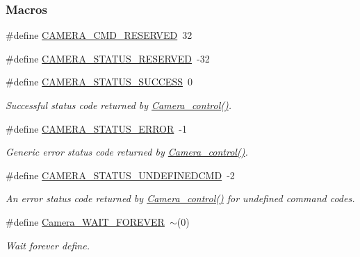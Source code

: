 \subsubsection*{Macros}
\begin{DoxyCompactItemize}
\item 
\#define \hyperlink{group___c_a_m_e_r_a___c_o_n_t_r_o_l_gaed2b3df48a75ec7e6e78320bb3a48eb9}{C\+A\+M\+E\+R\+A\+\_\+\+C\+M\+D\+\_\+\+R\+E\+S\+E\+R\+V\+E\+D}~32
\item 
\#define \hyperlink{group___c_a_m_e_r_a___c_o_n_t_r_o_l_ga13b3728d2673d72db6cc71744a0cbedf}{C\+A\+M\+E\+R\+A\+\_\+\+S\+T\+A\+T\+U\+S\+\_\+\+R\+E\+S\+E\+R\+V\+E\+D}~-\/32
\item 
\#define \hyperlink{group___camera___s_t_a_t_u_s_gaa4d73b4da4ce113c8fb545d1f2649257}{C\+A\+M\+E\+R\+A\+\_\+\+S\+T\+A\+T\+U\+S\+\_\+\+S\+U\+C\+C\+E\+S\+S}~0
\begin{DoxyCompactList}\small\item\em Successful status code returned by \hyperlink{_camera_8h_adfc7e9a60daa499220296a238a09b393}{Camera\+\_\+control()}. \end{DoxyCompactList}\item 
\#define \hyperlink{group___camera___s_t_a_t_u_s_ga2863402eca66d26cf447fc02340a0d45}{C\+A\+M\+E\+R\+A\+\_\+\+S\+T\+A\+T\+U\+S\+\_\+\+E\+R\+R\+O\+R}~-\/1
\begin{DoxyCompactList}\small\item\em Generic error status code returned by \hyperlink{_camera_8h_adfc7e9a60daa499220296a238a09b393}{Camera\+\_\+control()}. \end{DoxyCompactList}\item 
\#define \hyperlink{group___camera___s_t_a_t_u_s_gaae8cae4253d68cc8ae921b63a74d1cb9}{C\+A\+M\+E\+R\+A\+\_\+\+S\+T\+A\+T\+U\+S\+\_\+\+U\+N\+D\+E\+F\+I\+N\+E\+D\+C\+M\+D}~-\/2
\begin{DoxyCompactList}\small\item\em An error status code returned by \hyperlink{_camera_8h_adfc7e9a60daa499220296a238a09b393}{Camera\+\_\+control()} for undefined command codes. \end{DoxyCompactList}\item 
\#define \hyperlink{_camera_8h_a1b85e579e68cecb09d1e2be70a6c56a9}{Camera\+\_\+\+W\+A\+I\+T\+\_\+\+F\+O\+R\+E\+V\+E\+R}~$\sim$(0)
\begin{DoxyCompactList}\small\item\em Wait forever define. \end{DoxyCompactList}\end{DoxyCompactItemize}
